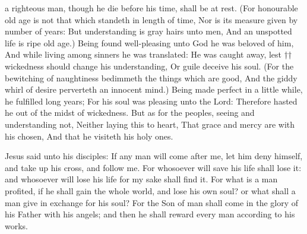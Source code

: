  a righteous man, though he die before his time, shall be at rest. (For honourable old age is not that which standeth in length of time, Nor is its measure given by number of years: But understanding is gray hairs unto men, And an unspotted life is ripe old age.) Being found well-pleasing unto God he was beloved of him, And while living among sinners he was translated: He was caught away, lest †† wickedness should change his understanding, Or guile deceive his soul. (For the bewitching of naughtiness bedimmeth the things which are good, And the giddy whirl of desire perverteth an innocent mind.) Being made perfect in a little while, he fulfilled long years; For his soul was pleasing unto the Lord: Therefore hasted he out of the midst of wickedness. But as for the peoples, seeing and understanding not, Neither laying this to heart, That grace and mercy are with his chosen, And that he visiteth his holy ones.


 Jesus said unto his disciples: If any man will come after me, let him deny himself, and take up his cross, and follow me. For whosoever will save his life shall lose it: and whosoever will lose his life for my sake shall find it. For what is a man profited, if he shall gain the whole world, and lose his own soul? or what shall a man give in exchange for his soul? For the Son of man shall come in the glory of his Father with his angels; and then he shall reward every man according to his works.



